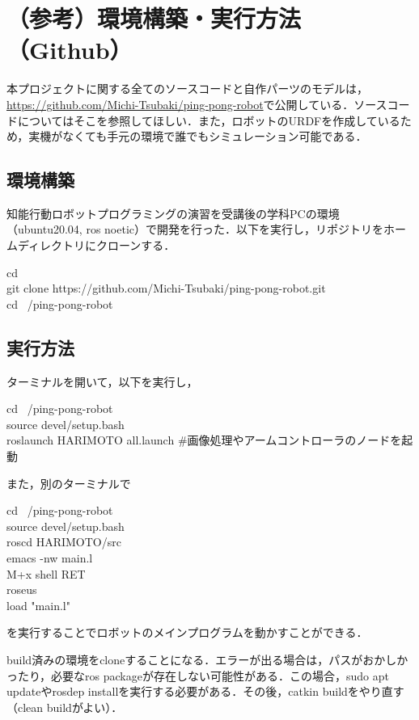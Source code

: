 \documentclass[10pt, oneside, titlepage]{ltjarticle}  %
\begin{document}
\section{（参考）環境構築・実行方法（Github）}
  本プロジェクトに関する全てのソースコードと自作パーツのモデルは， \url{https://github.com/Michi-Tsubaki/ping-pong-robot}で公開している．ソースコードについてはそこを参照してほしい．また，ロボットのURDFを作成しているため，実機がなくても手元の環境で誰でもシミュレーション可能である．
  \subsection{環境構築}
  知能行動ロボットプログラミングの演習を受講後の学科PCの環境（ubuntu20.04, ros noetic）で開発を行った．以下を実行し，リポジトリをホームディレクトリにクローンする．
  \begin{screen}
    cd ~ \\
    git clone https://github.com/Michi-Tsubaki/ping-pong-robot.git \\
    cd ~/ping-pong-robot
  \end{screen}
  \subsection{実行方法}
  ターミナルを開いて，以下を実行し，
  \begin{screen}
    cd ~/ping-pong-robot \\
    source devel/setup.bash \\
    roslaunch HARIMOTO all.launch \#画像処理やアームコントローラのノードを起動
  \end{screen}
  また，別のターミナルで
  \begin{screen}
    cd ~/ping-pong-robot\\
    source devel/setup.bash \\
    roscd HARIMOTO/src \\
    emacs -nw main.l \\
    M+x shell RET\\
    roseus \\
    load "main.l"
  \end{screen}
  を実行することでロボットのメインプログラムを動かすことができる．

  build済みの環境をcloneすることになる．エラーが出る場合は，パスがおかしかったり，必要なros packageが存在しない可能性がある．この場合，sudo apt updateやrosdep installを実行する必要がある．その後，catkin buildをやり直す（clean buildがよい）．
\end{document}
